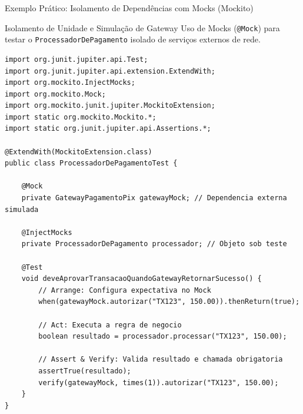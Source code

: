 \documentclass[aspectratio=169, 9pt]{beamer}
\begin{document}
\begin{frame}[fragile]{Exemplo Prático: Isolamento de Dependências com Mocks (Mockito)}
  \begin{block}{Isolamento de Unidade e Simulação de Gateway}
    Uso de Mocks (\texttt{@Mock}) para testar o \texttt{ProcessadorDePagamento} isolado de serviços externos de rede.
  \end{block}

  \begin{lstlisting}[style=javastyle]
import org.junit.jupiter.api.Test;
import org.junit.jupiter.api.extension.ExtendWith;
import org.mockito.InjectMocks;
import org.mockito.Mock;
import org.mockito.junit.jupiter.MockitoExtension;
import static org.mockito.Mockito.*;
import static org.junit.jupiter.api.Assertions.*;

@ExtendWith(MockitoExtension.class)
public class ProcessadorDePagamentoTest {

    @Mock
    private GatewayPagamentoPix gatewayMock; // Dependencia externa simulada

    @InjectMocks
    private ProcessadorDePagamento processador; // Objeto sob teste

    @Test
    void deveAprovarTransacaoQuandoGatewayRetornarSucesso() {
        // Arrange: Configura expectativa no Mock
        when(gatewayMock.autorizar("TX123", 150.00)).thenReturn(true);

        // Act: Executa a regra de negocio
        boolean resultado = processador.processar("TX123", 150.00);

        // Assert & Verify: Valida resultado e chamada obrigatoria
        assertTrue(resultado);
        verify(gatewayMock, times(1)).autorizar("TX123", 150.00);
    }
}
  \end{lstlisting}
\end{frame}
\end{document}
